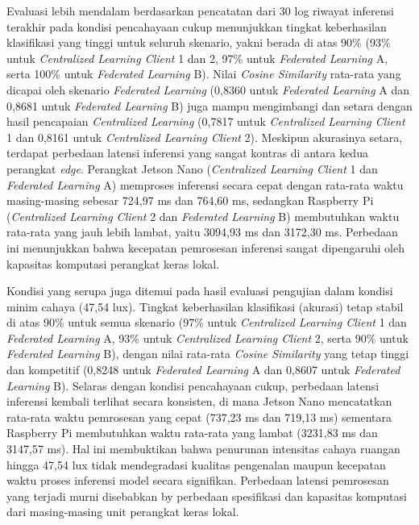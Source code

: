 Evaluasi lebih mendalam berdasarkan pencatatan dari 30 log riwayat inferensi terakhir pada kondisi pencahayaan cukup menunjukkan tingkat keberhasilan klasifikasi yang tinggi untuk seluruh skenario, yakni berada di atas 90\% (93\% untuk \textit{Centralized Learning Client} 1 dan 2, 97\% untuk \textit{Federated Learning} A, serta 100\% untuk \textit{Federated Learning} B). Nilai \textit{Cosine Similarity} rata-rata yang dicapai oleh skenario \textit{Federated Learning} (0,8360 untuk \textit{Federated Learning} A dan 0,8681 untuk \textit{Federated Learning} B) juga mampu mengimbangi dan setara dengan hasil pencapaian \textit{Centralized Learning} (0,7817 untuk \textit{Centralized Learning Client} 1 dan 0,8161 untuk \textit{Centralized Learning Client} 2). Meskipun akurasinya setara, terdapat perbedaan latensi inferensi yang sangat kontras di antara kedua perangkat \textit{edge}. Perangkat Jetson Nano (\textit{Centralized Learning Client} 1 dan \textit{Federated Learning} A) memproses inferensi secara cepat dengan rata-rata waktu masing-masing sebesar 724,97 ms dan 764,60 ms, sedangkan Raspberry Pi (\textit{Centralized Learning Client} 2 dan \textit{Federated Learning} B) membutuhkan waktu rata-rata yang jauh lebih lambat, yaitu 3094,93 ms dan 3172,30 ms. Perbedaan ini menunjukkan bahwa kecepatan pemrosesan inferensi sangat dipengaruhi oleh kapasitas komputasi perangkat keras lokal.

Kondisi yang serupa juga ditemui pada hasil evaluasi pengujian dalam kondisi minim cahaya (47,54 lux). Tingkat keberhasilan klasifikasi (akurasi) tetap stabil di atas 90\% untuk semua skenario (97\% untuk \textit{Centralized Learning Client} 1 dan \textit{Federated Learning} A, 93\% untuk \textit{Centralized Learning Client} 2, serta 90\% untuk \textit{Federated Learning} B), dengan nilai rata-rata \textit{Cosine Similarity} yang tetap tinggi dan kompetitif (0,8248 untuk \textit{Federated Learning} A dan 0,8607 untuk \textit{Federated Learning} B). Selaras dengan kondisi pencahayaan cukup, perbedaan latensi inferensi kembali terlihat secara konsisten, di mana Jetson Nano mencatatkan rata-rata waktu pemrosesan yang cepat (737,23 ms dan 719,13 ms) sementara Raspberry Pi membutuhkan waktu rata-rata yang lambat (3231,83 ms dan 3147,57 ms). Hal ini membuktikan bahwa penurunan intensitas cahaya ruangan hingga 47,54 lux tidak mendegradasi kualitas pengenalan maupun kecepatan waktu proses inferensi model secara signifikan. Perbedaan latensi pemrosesan yang terjadi murni disebabkan by perbedaan spesifikasi dan kapasitas komputasi dari masing-masing unit perangkat keras lokal.

